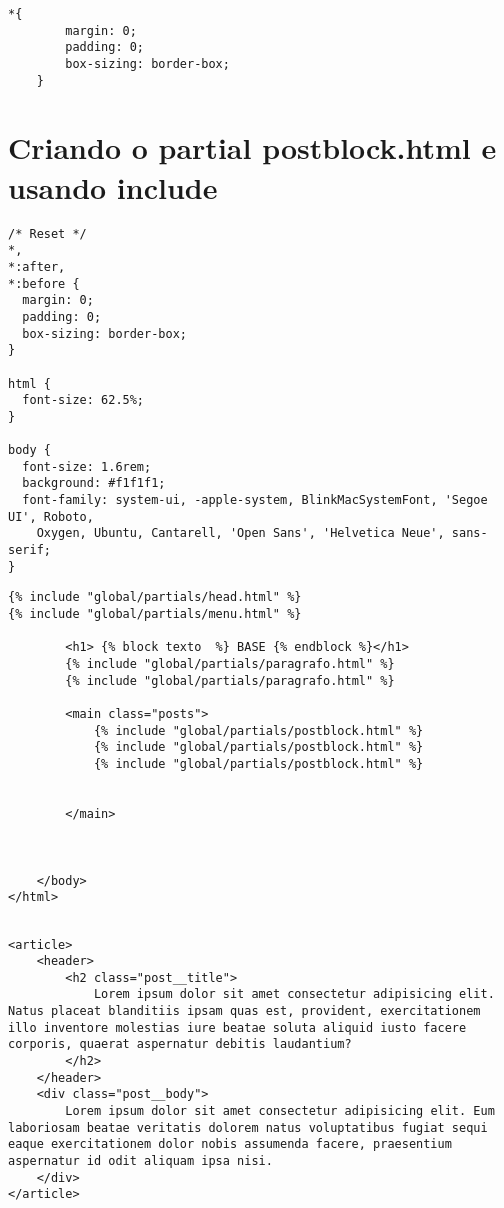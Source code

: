 \documentclass{article}
\begin{document}
\begin{lstlisting}[style=cssStyle, caption={base/static/global/css/style.css}]
    *{
        margin: 0;
        padding: 0;
        box-sizing: border-box; 
    }    

\end{lstlisting}
\section{Criando o partial postblock.html e usando include}
\begin{lstlisting}[style=cssStyle, caption={base/static/global/css/style.css}]
    /* Reset */
*,
*:after,
*:before {
  margin: 0;
  padding: 0;
  box-sizing: border-box;
}

html {
  font-size: 62.5%;
}

body {
  font-size: 1.6rem;
  background: #f1f1f1;
  font-family: system-ui, -apple-system, BlinkMacSystemFont, 'Segoe UI', Roboto,
    Oxygen, Ubuntu, Cantarell, 'Open Sans', 'Helvetica Neue', sans-serif;
}
\end{lstlisting}

\begin{lstlisting}[style=djangohtml, caption={base/global/base.html}]
{% include "global/partials/head.html" %}
{% include "global/partials/menu.html" %}

        <h1> {% block texto  %} BASE {% endblock %}</h1>
        {% include "global/partials/paragrafo.html" %}
        {% include "global/partials/paragrafo.html" %}

        <main class="posts">
            {% include "global/partials/postblock.html" %}
            {% include "global/partials/postblock.html" %}
            {% include "global/partials/postblock.html" %}
        

        </main>
        
        
        
    </body>
</html>
   
\end{lstlisting}

\begin{lstlisting}[style=djangohtml, caption={base/global/partials/postblock.html}]
    <article>
    <header>
        <h2 class="post__title">
            Lorem ipsum dolor sit amet consectetur adipisicing elit. Natus placeat blanditiis ipsam quas est, provident, exercitationem illo inventore molestias iure beatae soluta aliquid iusto facere corporis, quaerat aspernatur debitis laudantium?
        </h2>
    </header>
    <div class="post__body">
        Lorem ipsum dolor sit amet consectetur adipisicing elit. Eum laboriosam beatae veritatis dolorem natus voluptatibus fugiat sequi eaque exercitationem dolor nobis assumenda facere, praesentium aspernatur id odit aliquam ipsa nisi.
    </div>
</article>

   
\end{lstlisting}
\end{document}
